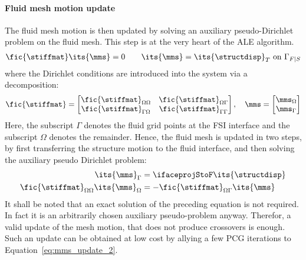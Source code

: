 \documentclass[../main.tex]{subfiles}
\begin{document}
\paragraph{\raisebox{.5pt}{\textcircled{\raisebox{-.9pt} {3}}} Fluid mesh motion update}
The fluid mesh motion is then updated by solving an auxiliary pseudo-Dirichlet problem on the fluid mesh. This step is at the very heart of the \ac{ALE} algorithm.
\begin{align}
\fic{\stiffmat} \its{\mms} = 0~~~\text{}~~~\its{\mms}=\its{\structdisp}_T~\text{on}~\Gamma_{F|S}
\end{align}
where the Dirichlet conditions are introduced into the system via a decomposition:
\begin{align}
\fic{\stiffmat}=
\begin{bmatrix}
\fic{\stiffmat}_{\Omega\Omega}   &  \fic{\stiffmat}_{\Omega\Gamma}   \\
\fic{\stiffmat}_{\Gamma\Omega}   &  \fic{\stiffmat}_{\Gamma\Gamma}   \\
\end{bmatrix},~~~
\mms=
\begin{bmatrix}
\mms_{\Omega} \\
\mms_{\Gamma} \\
\end{bmatrix}
\end{align}
Here, the subscript $\Gamma$ denotes the fluid grid points at the FSI interface and the subscript $\Omega$ denotes the remainder. Hence, the fluid mesh is updated in two steps, by first transferring the structure motion to the fluid interface, and then solving the auxiliary pseudo Dirichlet problem:
\begin{align}
\its{\mms}_{\Gamma}&=\ifaceprojStoF \its{\structdisp}\label{eq:mms_update_1}\\
\fic{\stiffmat}_{\Omega\Omega} \its{\mms}_\Omega &= -\fic{\stiffmat}_{\Omega\Gamma} \its{\mms} \label{eq:mms_update_2}
\end{align}
It shall be noted that an exact solution of the preceding equation is not required. In fact it is an arbitrarily chosen auxiliary pseudo-problem anyway. Therefor, a valid update of the mesh motion, that does not produce crossovers is enough. Such an update can be obtained at low cost by allying a few \ac{PCG} iterations to Equation~\eqref{eq:mms_update_2}.
\end{document}
